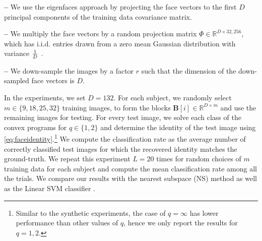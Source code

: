 \documentclass[10pt,twocolumn,twoside] {IEEEtran}
\begin{document}
{\noindent\textbf{--} We use the eigenfaces approach \cite{Turk:CVPR91} by
projecting the face vectors to the first $D$ principal components of
the training data covariance matrix.

\noindent\textbf{--} We multiply the face vectors by a random projection
matrix $\Phi \in {\mathbb{R}}^{D \times 32,256}$, which has i.i.d. entries
drawn from a zero mean Gaussian distribution with variance $1\over
D$  \cite{Baraniuk:CA08, Wright:PAMI09}.

\noindent\textbf{--} We down-sample the images by a factor $r$ such that the
dimension of the down-sampled face vectors is $D$.

In the experiments, we set $D = 132$. For each subject, we randomly select $m \in \{9, 18, 25, 32 \}$ training images, to form the blocks ${\boldsymbol{B}}[i] \in {\mathbb{R}}^{D \times m}$ and use the remaining images for testing. For every test image, we solve each class of the convex programs for $q \in \{ 1, 2 \}$ and determine the identity of the test image using \eqref{eq:faceidentity}.\footnote{Similar to the synthetic experiments, the case of $q = \infty$ has lower performance than other values of $q$, hence we only report the results for $q = 1, 2.$} 
We compute the classification rate as the average number of correctly classified test images for which the recovered identity matches the ground-truth. We repeat this experiment $L=20$ times for random choices of $m$ training data for each subject and compute the mean classification rate among all the trials. 
We compare our results with the nearest subspace (NS) method \cite{Ho:CVPR03} as well as the Linear SVM classifier \cite{Duda:04}.

}
\end{document}
